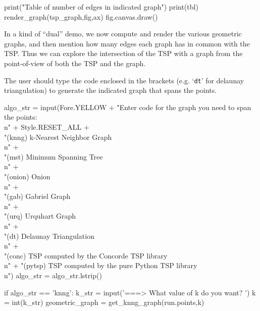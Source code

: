 print("Table of number of edges in indicated graph")
print(tbl)
render_graph(tsp_graph,fig,ax)
fig.canvas.draw()
\nwendcode{}\nwdocspar

In a kind of ``dual'' demo, we now compute and render the various geometric graphs, and then mention how many 
edges each graph has in common with the TSP. Thus we can explore the intersection of the TSP with a graph
from the point-of-view of both the TSP and the graph. 

The user should type the code enclosed in the brackets (e.g. `\verb|dt|' for delaunay triangulation) to generate the 
indicated graph that spans the points. 

\nwenddocs{}\endmoddef\nwstartdeflinemarkup{}\nwenddeflinemarkup
algo_str = input(Fore.YELLOW + "Enter code for the graph you need to span the points:\\n" + Style.RESET_ALL  +\\
                     "(knng)   k-Nearest Neighbor Graph        \\n"            +\\
                     "(mst)    Minimum Spanning Tree           \\n"            +\\
                     "(onion)  Onion                           \\n"            +\\
                     "(gab)    Gabriel Graph                 \\n"            +\\
                     "(urq)    Urquhart Graph                    \\n"            +\\
                     "(dt)     Delaunay Triangulation         \\n"             +\\
                     "(conc)   TSP computed by the Concorde TSP library \\n" +
                     "(pytsp)  TSP computed by the pure Python TSP library \\n")
algo_str = algo_str.lstrip()

if algo_str == 'knng':
      k_str = input('===> What value of k do you want? ')
      k     = int(k_str)
      geometric_graph = get_knng_graph(run.points,k)

